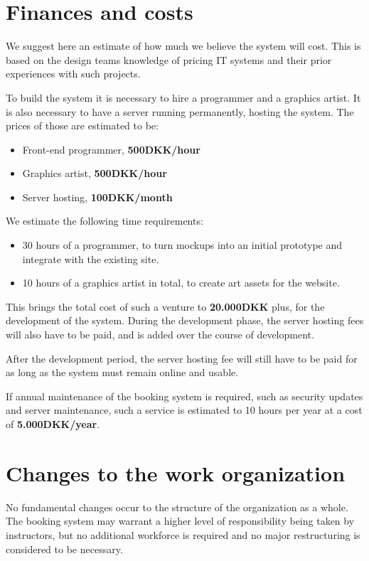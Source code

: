 \newpage
\section{Finances and costs}
We suggest here an estimate of how much we believe the system will cost. This
is based on the design teams knowledge of pricing IT systems and their 
prior experiences with such projects. 

To build the system it is necessary to hire a programmer and a graphics artist.
It is also necessary to have a server running permanently, hosting the system. 
The prices of those are estimated to be:

\begin{itemize}
\item Front-end programmer, \textbf{500DKK/hour}
\item Graphics artist, \textbf{500DKK/hour}
\item Server hosting, \textbf{100DKK/month}
\end{itemize}

We estimate the following time requirements:

\begin{itemize}
	\item 30 hours of a programmer, to turn mockups into an initial prototype and integrate with the existing site.
	\item 10 hours of a graphics artist in total, to create art assets for the website.
\end{itemize}

This brings the total cost of such a venture to \textbf{20.000DKK} plus, for the 
development of the system. During the development phase, the server hosting
fees will also have to be paid, and is added over the course of development.

After the development period, the server hosting fee will still have to be paid
for as long as the system must remain online and usable. 

If annual maintenance of the booking system is required, such as security
updates and server maintenance, such a service is estimated to 10 hours per year
at a cost of \textbf{5.000DKK/year}.

\section{Changes to the work organization}
No fundamental changes occur to the structure of the organization as a whole.
The booking system may warrant a higher level of responsibility being taken by
instructors, but no additional workforce is required and no major restructuring
is considered to be necessary.

